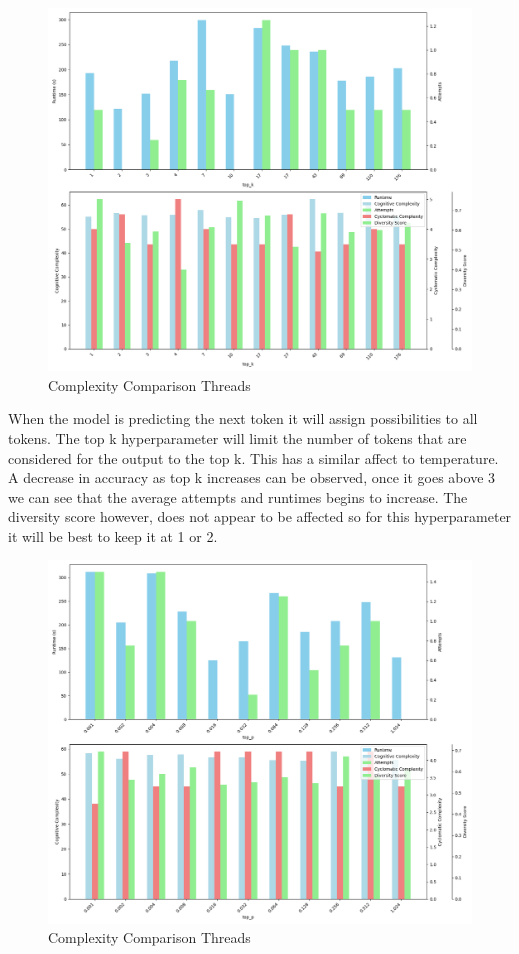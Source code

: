 \documentclass[12pt]{extarticle}
\begin{document}
\begin{figure}[h!]
\centering
\includegraphics[width=0.8\linewidth]{Images/Hyperparam_top_k_Comparison.png}
\caption{Complexity Comparison Threads}
\label{fig:Complexity_Comparison_Threads}
\end{figure}

When the model is predicting the next token it will assign possibilities to all tokens. The top k hyperparameter will limit the number of tokens that are considered for the output to the top k. This has a similar affect to temperature. A decrease in accuracy as top k increases can be observed, once it goes above 3 we can see that the average attempts and runtimes begins to increase. The diversity score however, does not appear to be affected so for this hyperparameter it will be best to keep it at 1 or 2.

\begin{figure}[h!]
\centering
\includegraphics[width=0.8\linewidth]{Images/Hyperparam_top_p_Comparison.png}
\caption{Complexity Comparison Threads}
\label{fig:Complexity_Comparison_Threads}
\end{figure}
\end{document}
